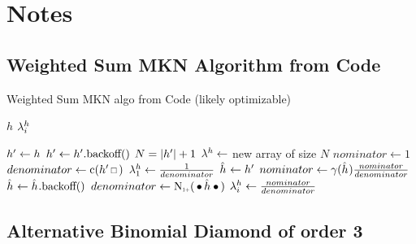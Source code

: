 \chapter{Notes}
\label{ch:notes}


\section{Weighted Sum MKN Algorithm from Code}

\begin{algorithm}
  \caption{Weighted Sum MKN algo from Code (likely optimizable)}
  \begin{algorithmic}[1]
    \Require $h$
    \Ensure $\lambda_i^h$

    \State $h^\prime \gets h$
      \State $h^\prime \gets h^\prime\text{.backoff()}$
    \EndWhile
    \State $N = {\left|h^\prime\right|} + 1$
    \State $\lambda^h \gets$ new array of size $N$
    \State $nominator \gets 1$
    \State $denominator \gets \Count(\SeenHistory \Skp)$
    \State $\lambda_1^h \gets \frac{1}{denominator}$
    \State $\DerivedHistory \gets \SeenHistory$
      \State $nominator \gets \gamma(\DerivedHistory) \frac{nominator}{denominator}$
      \State $\DerivedHistory \gets \DerivedHistory\text{.backoff()}$
      \State $denominator \gets \ContCountIp(\WSkp \DerivedHistory \WSkp)$
      \State $\lambda_i^h \gets \frac{nominator}{denominator}$
    \EndFor
  \end{algorithmic}
\end{algorithm}

\clearpage
\section{Alternative Binomial Diamond of order 3}

